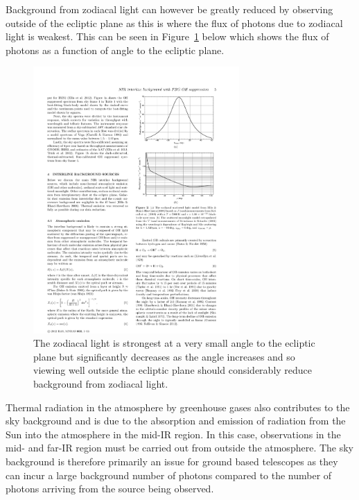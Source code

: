 		Background from zodiacal light can however be greatly reduced by observing outside of the ecliptic plane as this is where the flux of photons due to zodiacal light is weakest. This can be seen in Figure~\ref{fig:zodiacal_light_graph} below which shows the flux of photons as a function of angle to the ecliptic plane.
		\begin{figure}[!htbp]
			\centering
			\includegraphics[trim = 110mm 198mm 25mm 30mm, clip, width=0.7\textwidth]{../Images/zodiacal_Light_graph.pdf}
			\caption[Zodiacal light vs angle]{The zodiacal light is strongest at a very small angle to the ecliptic plane but significantly decreases as the angle increases and so viewing well outside the ecliptic plane should considerably reduce background from zodiacal light\cite{Zodiacal_Light_over_La_Silla}.}\label{fig:zodiacal_light_graph}
		\end{figure}

		Thermal radiation in the atmosphere by greenhouse gases also contributes to the sky background and is due to the absorption and emission of radiation from the Sun into the atmosphere in the mid-IR region. In this case, observations in the mid- and far-IR region must be carried out from outside the atmosphere\cite{Extragalactic_Astronomy_and_Cosmology}. The sky background is therefore primarily an issue for ground based telescopes as they can incur a large background number of photons compared to the number of photons arriving from the source being observed.

